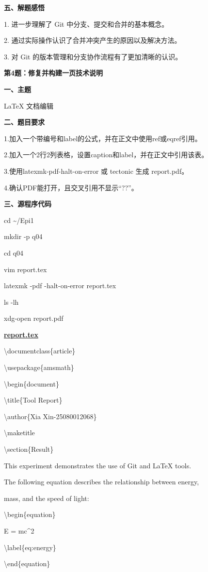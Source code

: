 \documentclass[12pt,a4paper]{article}
\newcommand{\ul}[1]{\underline{#1}}
\begin{document}
\textbf{五、解题感悟}

1. 进一步理解了 Git 中分支、提交和合并的基本概念。

2. 通过实际操作认识了合并冲突产生的原因以及解决方法。

3. 对 Git 的版本管理和分支协作流程有了更加清晰的认识。

\textbf{第4题：修复并构建一页技术说明}

\textbf{一、主题}

LaTeX 文档编辑

\textbf{二、题目要求}

1.加入一个带编号和label的公式，并在正文中使用ref或eqref引用。

2.加入一个2行2列表格，设置caption和label，并在正文中引用该表。

3.使用latexmk-pdf-halt-on-error 或 tectonic 生成 report.pdf。

4.确认PDF能打开，且交叉引用不显示``??''。

\textbf{三、源程序代码}

cd \textasciitilde/Epi1

mkdir -p q04

cd q04

vim report.tex

latexmk -pdf -halt-on-error report.tex

ls -lh

xdg-open report.pdf

\textbf{\ul{report.tex}}

\textbackslash documentclass\{article\}

\textbackslash usepackage\{amsmath\}

\textbackslash begin\{document\}

\textbackslash title\{Tool Report\}

\textbackslash author\{Xia Xin-25080012068\}

\textbackslash maketitle

\textbackslash section\{Result\}

This experiment demonstrates the use of Git and LaTeX tools.

The following equation describes the relationship between energy,

mass, and the speed of light:

\textbackslash begin\{equation\}

E = mc\^{}2

\textbackslash label\{eq:energy\}

\textbackslash end\{equation\}
\end{document}
